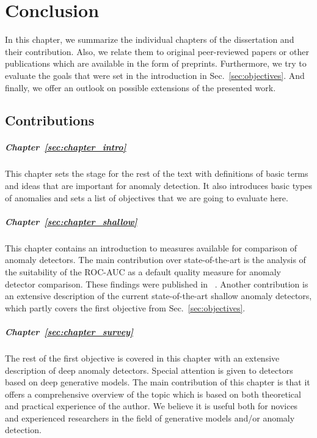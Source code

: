 \chapter{Conclusion} \label{sec:conclusion}
In this chapter, we summarize the individual chapters of the dissertation and their contribution. Also, we relate them to original peer-reviewed papers or other publications which are available in the form of preprints. Furthermore, we try to evaluate the goals that were set in the introduction in Sec.~\ref{sec:objectives}. And finally, we offer an outlook on possible extensions of the presented work.

\section{Contributions}
\paragraph{Chapter~\ref{sec:chapter_intro}} This chapter sets the stage for the rest of the text with definitions of basic terms and ideas that are important for anomaly detection. It also introduces basic types of anomalies and sets a list of objectives that we are going to evaluate here.

\paragraph{Chapter~\ref{sec:chapter_shallow}} This chapter contains an introduction to measures available for comparison of anomaly detectors. The main contribution over state-of-the-art is the analysis of the suitability of the ROC-AUC as a default quality measure for anomaly detector comparison. These findings were published in ~\cite{vskvara2023auc}. Another contribution is an extensive description of the current state-of-the-art shallow anomaly detectors, which partly covers the first objective from Sec.~\ref{sec:objectives}.

\paragraph{Chapter~\ref{sec:chapter_survey}} The rest of the first objective is covered in this chapter with an extensive description of deep anomaly detectors. Special attention is given to detectors based on deep generative models. The main contribution of this chapter is that it offers a comprehensive overview of the topic which is based on both theoretical and practical experience of the author. We believe it is useful both for novices and experienced researchers in the field of generative models and/or anomaly detection.

